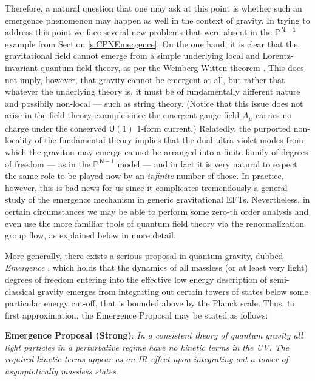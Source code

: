 Therefore, a natural question that one may ask at this point is whether such an emergence phenomenon may happen as well in the context of gravity. In trying to address this point we face several new problems that were absent in the $\mathbb{P}^{\,\mathsf{N-1}}$ example from Section \ref{s:CPNEmergence}. On the one hand, it is clear that the gravitational field cannot emerge from a simple underlying local and Lorentz-invariant quantum field theory, as per the Weinberg-Witten theorem \cite{Weinberg:1980kq}. This does not imply, however, that gravity cannot be emergent at all, but rather that whatever the underlying theory is, it must be of fundamentally different nature and possibily non-local --- such as string theory. (Notice that this issue does not arise in the field theory example since the emergent gauge field $A_{\mu}$ carries no charge under the conserved $\mathsf{U}(1)$ 1-form current.) Relatedly, the purported non-locality of the fundamental theory implies that the dual ultra-violet modes from which the graviton may emerge cannot be arranged into a finite family of degrees of freedom --- as in the $\mathbb{P}^{\,\mathsf{N-1}}$ model --- and in fact it is very natural to expect the same role to be played now by an \emph{infinite} number of those. In practice, however, this is bad news for us since it complicates tremendously a general study of the emergence mechanism in generic gravitational EFTs. Nevertheless, in certain circumstances we may be able to perform some zero-th order analysis and even use the more familiar tools of quantum field theory via the renormalization group flow, as explained below in more detail.
 
More generally, there exists a serious proposal in quantum gravity, dubbed \emph{Emergence} \cite{Palti:2019pca,Harlow:2015lma,Grimm:2018ohb,Corvilain:2018lgw,Heidenreich:2017sim,Heidenreich:2018kpg}, which holds that the dynamics of all massless (or at least very light) degrees of freedom entering into the effective low energy description of semi-classical gravity emerges from integrating out certain towers of states below some particular energy cut-off, that is bounded above by the Planck scale. Thus, to first approximation, the Emergence Proposal may be stated as follows:

\newpage

\begin{center}
	\textbf{Emergence Proposal (Strong)}: \textit{In a consistent theory of quantum gravity all light particles in a perturbative regime  have no kinetic terms in the UV. The required kinetic terms appear as an IR effect upon integrating out a tower of asymptotically massless states.} 
\end{center}	
	
